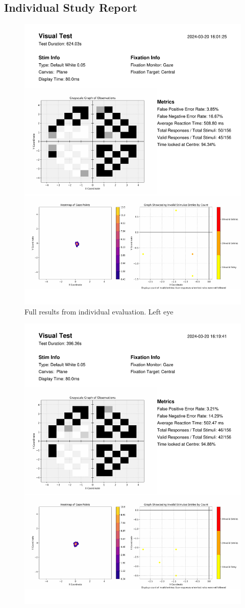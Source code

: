 \documentclass{l4proj}
\begin{document}
\begin{appendices}
\subsection{Individual Study Report} \label{full_individual_study}
\begin{figure}[htbp]
    \centering
    \includegraphics[page=1,width=0.8\linewidth]{dissertation/images/individual_left_full.pdf}   
    \caption{Full results from individual evaluation. Left eye}
\end{figure}
\newpage
\begin{figure}[htbp]
    \centering
    \includegraphics[page=1,width=0.8\linewidth]{dissertation/images/individual_right_full.pdf}   

\end{figure}
\end{appendices}
\end{document}
